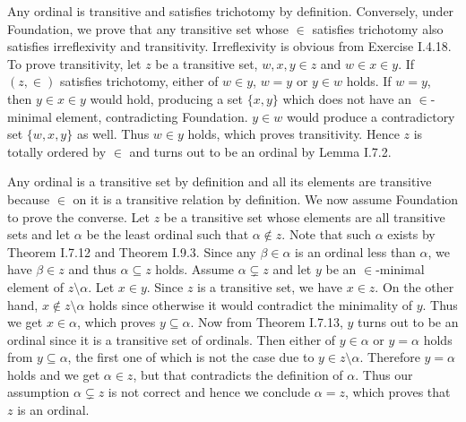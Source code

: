 \documentclass[12pt]{article}
\theoremstyle{definition}
\newenvironment{customthm}[1]
  {\renewcommand\theinnercustomthm{#1}\innercustomthm}
  {\endinnercustomthm}
\begin{document}
\begin{customthm}{I.7.25}
  Any ordinal is transitive and satisfies trichotomy by definition. Conversely, under Foundation, we prove that any transitive set whose $\in$ satisfies trichotomy also satisfies irreflexivity and transitivity. Irreflexivity is obvious from Exercise I.4.18. To prove transitivity, let $z$ be a transitive set, $w,x,y\in z$ and $w\in x\in y$. If $(z,\in)$ satisfies trichotomy, either of $w\in y$, $w=y$ or $y\in w$ holds. If $w=y$, then $y\in x\in y$ would hold, producing a set $\{x,y\}$ which does not have an $\in$-minimal element, contradicting Foundation. $y\in w$ would produce a contradictory set $\{w,x,y\}$ as well. Thus $w\in y$ holds, which proves transitivity. Hence $z$ is totally ordered by $\in$ and turns out to be an ordinal by Lemma I.7.2.
\end{customthm}

\begin{customthm}{I.7.26}
  Any ordinal is a transitive set by definition and all its elements are transitive because $\in$ on it is a transitive relation by definition. We now assume Foundation to prove the converse. Let $z$ be a transitive set whose elements are all transitive sets and let $\alpha$ be the least ordinal such that $\alpha\not\in z$. Note that such $\alpha$ exists by Theorem I.7.12 and Theorem I.9.3. Since any $\beta\in\alpha$ is an ordinal less than $\alpha$, we have $\beta\in z$ and thus $\alpha\subseteq z$ holds. Assume $\alpha\subsetneq z$ and let $y$ be an $\in$-minimal element of $z\setminus\alpha$. Let $x\in y$. Since $z$ is a transitive set, we have $x\in z$. On the other hand, $x\not\in z\setminus\alpha$ holds since otherwise it would contradict the minimality of $y$. Thus we get $x\in\alpha$, which proves $y\subseteq\alpha$. Now from Theorem I.7.13, $y$ turns out to be an ordinal since it is a transitive set of ordinals. Then either of $y\in\alpha$ or $y=\alpha$ holds from $y\subseteq\alpha$, the first one of which is not the case due to $y\in z\setminus\alpha$. Therefore $y=\alpha$ holds and we get $\alpha\in z$, but that contradicts the definition of $\alpha$. Thus our assumption $\alpha\subsetneq z$ is not correct and hence we conclude $\alpha=z$, which proves that $z$ is an ordinal.
\end{customthm}
\end{document}
